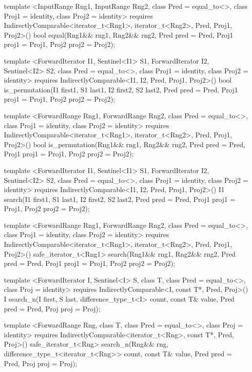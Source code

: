 \begin{codeblock}
{{{{  template <InputRange Rng1, InputRange Rng2, class Pred = equal_to<>,
      class Proj1 = identity, class Proj2 = identity>
    requires IndirectlyComparable<iterator_t<Rng1>, iterator_t<Rng2>, Pred, Proj1, Proj2>()
    bool equal(Rng1&& rng1, Rng2&& rng2, Pred pred = Pred{},
               Proj1 proj1 = Proj1{}, Proj2 proj2 = Proj2{});


  template <ForwardIterator I1, Sentinel<I1> S1, ForwardIterator I2,
      Sentinel<I2> S2, class Pred = equal_to<>, class Proj1 = identity,
      class Proj2 = identity>
    requires IndirectlyComparable<I1, I2, Pred, Proj1, Proj2>()
    bool is_permutation(I1 first1, S1 last1, I2 first2, S2 last2,
                        Pred pred = Pred{},
                        Proj1 proj1 = Proj1{}, Proj2 proj2 = Proj2{});

  template <ForwardRange Rng1, ForwardRange Rng2, class Pred = equal_to<>,
      class Proj1 = identity, class Proj2 = identity>
    requires IndirectlyComparable<iterator_t<Rng1>, iterator_t<Rng2>, Pred, Proj1, Proj2>()
    bool is_permutation(Rng1&& rng1, Rng2&& rng2, Pred pred = Pred{},
                        Proj1 proj1 = Proj1{}, Proj2 proj2 = Proj2{});

  template <ForwardIterator I1, Sentinel<I1> S1, ForwardIterator I2,
      Sentinel<I2> S2, class Pred = equal_to<>,
      class Proj1 = identity, class Proj2 = identity>
    requires IndirectlyComparable<I1, I2, Pred, Proj1, Proj2>()
    I1
      search(I1 first1, S1 last1, I2 first2, S2 last2,
             Pred pred = Pred{},
             Proj1 proj1 = Proj1{}, Proj2 proj2 = Proj2{});

  template <ForwardRange Rng1, ForwardRange Rng2, class Pred = equal_to<>,
      class Proj1 = identity, class Proj2 = identity>
    requires IndirectlyComparable<iterator_t<Rng1>, iterator_t<Rng2>, Pred, Proj1, Proj2>()
    safe_iterator_t<Rng1>
      search(Rng1&& rng1, Rng2&& rng2, Pred pred = Pred{},
             Proj1 proj1 = Proj1{}, Proj2 proj2 = Proj2{});

  template <ForwardIterator I, Sentinel<I> S, class T,
      class Pred = equal_to<>, class Proj = identity>
    requires IndirectlyComparable<I, const T*, Pred, Proj>()
    I
      search_n(I first, S last, difference_type_t<I> count,
               const T& value, Pred pred = Pred{},
               Proj proj = Proj{});

  template <ForwardRange Rng, class T, class Pred = equal_to<>,
      class Proj = identity>
    requires IndirectlyComparable<iterator_t<Rng>, const T*, Pred, Proj>()
    safe_iterator_t<Rng>
      search_n(Rng&& rng, difference_type_t<iterator_t<Rng>> count,
               const T& value, Pred pred = Pred{}, Proj proj = Proj{});

}}}}
\end{codeblock}
